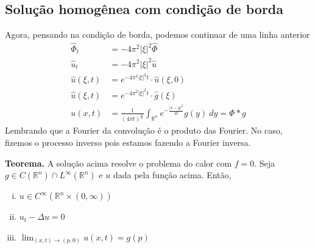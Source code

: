 \documentclass[11pt]{article}
\newcommand{\Rn}{{\mathbb{R}^n}}
\newcommand{\parentesis}[1]{\left(#1\right)}
\begin{document}
\subsection*{Solução homogênea com condição de borda}
Agora, pensando na condição de borda, podemos continuar de uma linha anterior \begin{align*}
	\hat{\Phi}_t &= - 4\pi^2 |\xi|^2 \hat{\Phi} \\
	\hat{u}_t &= - 4\pi^2 |\xi|^2 \hat{u} \\
	\hat{u}(\xi,t) &= e^{-4\pi^2|\xi|^2 t} \cdot \hat{u}(\xi,0) \\
	\hat{u}(\xi,t) &= e^{-4\pi^2|\xi|^2 t} \cdot \hat{g}(\xi) \\
	u(x,t) &= \frac{1}{\parentesis{4\pi t}^\frac{n}{2}} \int_\Rn e^{-\frac{|x-y|^2}{4t}} g(y)\ dy  = \Phi * g
\end{align*}
Lembrando que a Fourier da convolução é o produto das Fourier. No caso, fizemos o processo inverso pois estamos fazendo a Fourier inversa.

\textbf{Teorema.} A solução acima resolve o problema do calor com \(f=0\).
Seja \(g \in C(\Rn) \cap L^\infty(\Rn)\) e \(u\) dada pela função acima. Então,\begin{enumerate}[(i)]
	\item \(u \in C^\infty(\Rn \times (0,\infty))\)
	\item \(u_t - \Delta u = 0\)
	\item \(\lim_{(x,t)\rightarrow(p,0)} u(x,t) = g(p)\)
\end{enumerate}
\end{document}
